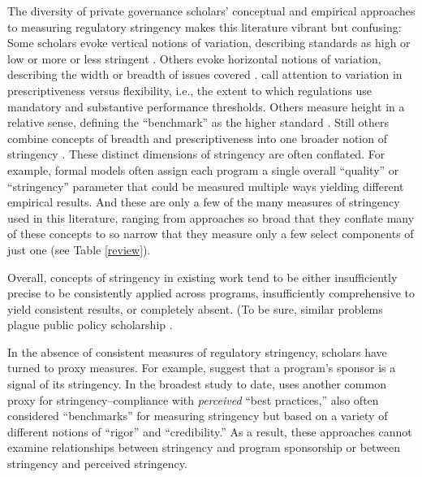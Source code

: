 \documentclass[
      12pt,
            Review ]{article}
\begin{document}
The diversity of private governance scholars' conceptual and empirical
approaches to measuring regulatory stringency makes this literature
vibrant but confusing: Some scholars evoke vertical notions of
variation, describing standards as high or low or more or less stringent
\citep{Fischer2014, Li2015}. Others evoke horizontal notions of
variation, describing the width or breadth of issues covered
\citep{Auld2014, Heyes2017}. \citet{Cashore2007} call attention to
variation in prescriptiveness versus flexibility, i.e., the extent to
which regulations use mandatory and substantive performance thresholds.
Others measure height in a relative sense, defining the ``benchmark'' as
the higher standard \citep{Overdevest2005, Overdevest2010}. Still others
combine concepts of breadth and prescriptiveness into one broader notion
of stringency \citep{Fransen2011}. These distinct dimensions of
stringency are often conflated. For example, formal models often assign
each program a single overall ``quality'' or ``stringency'' parameter
that could be measured multiple ways yielding different empirical
results. And these are only a few of the many measures of stringency
used in this literature, ranging from approaches so broad that they
conflate many of these concepts to so narrow that they measure only a
few select components of just one (see Table \ref{review}).

Overall, concepts of stringency in existing work tend to be either
insufficiently precise to be consistently applied across programs,
insufficiently comprehensive to yield consistent results, or completely
absent. (To be sure, similar problems plague public policy scholarship
\citep[\citet{Howlett2007}]{Brunel2016}.



In the absence of consistent measures of regulatory stringency, scholars
have turned to proxy measures. For example, \citet{Darnall2010} suggest
that a program's sponsor is a signal of its stringency. In the broadest
study to date, \citet{VanderVen2015} uses another common proxy for
stringency--compliance with \emph{perceived} ``best practices,'' also
often considered ``benchmarks'' for measuring stringency but based on a
variety of different notions of ``rigor'' and ``credibility.'' As a
result, these approaches cannot examine relationships between stringency
and program sponsorship or between stringency and perceived stringency.
\end{document}
